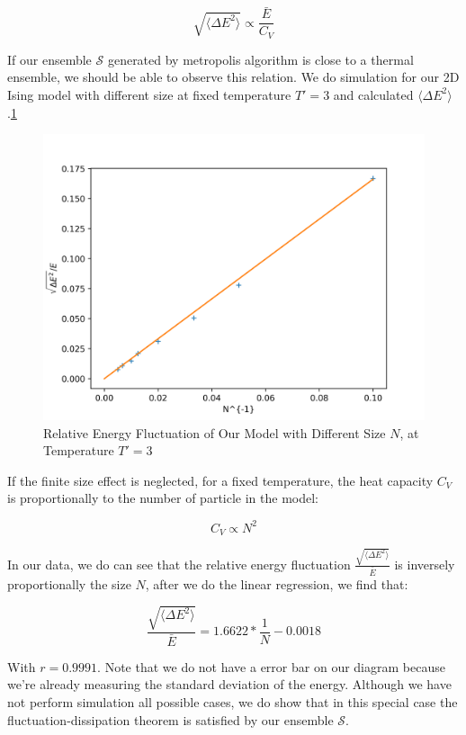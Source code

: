 \documentclass[11pt]{article}
\begin{document}
\begin{equation}
    \sqrt{\langle \Delta E^2\rangle} \propto \frac{\bar E}{C_V}
\end{equation}

If our ensemble $\mathcal{S}$ generated by metropolis algorithm is close to a thermal ensemble, we should be able to observe this relation. We do simulation for our 2D Ising model with different size at fixed temperature $T'=3$ and calculated $\langle \Delta E^2\rangle$.\ref{fluctuation}

\begin{figure}
    \centering
    \includegraphics[width=0.8\linewidth]{plots/fluctuation-ensemblesize.png}
    \caption{Relative Energy Fluctuation of Our Model with Different Size $N$, at Temperature $T'=3$}
    \label{fluctuation}
\end{figure}

If the finite size effect is neglected, for a fixed temperature, the heat capacity $C_V$ is proportionally to the number of particle in the model:

\begin{equation}
    C_V \propto N^2
\end{equation}

In our data, we do can see that the relative energy fluctuation $\frac{\sqrt{\langle \Delta E^2\rangle}}{\bar E}$ is inversely proportionally the size $N$, after we do the linear regression, we find that:

\begin{equation}
    \frac{\sqrt{\langle \Delta E^2\rangle}}{\bar E} = 1.6622 * \frac{1}{N}  -0.0018
\end{equation}

With $r = 0.9991$. Note that we do not have a error bar on our diagram because we're already measuring the standard deviation of the energy. Although we have not perform simulation all possible cases, we do show that in this special case the fluctuation-dissipation theorem is satisfied by our ensemble $\mathcal{S}$. 
\end{document}
